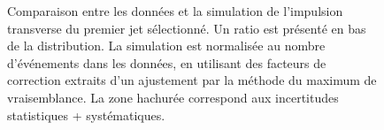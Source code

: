 \begin{figure}[p!]
    \caption{Comparaison entre les données et la simulation de l'impulsion transverse du premier jet sélectionné. Un ratio est présenté en bas de la distribution. La simulation est normalisée au nombre d'événements dans les données, en utilisant des facteurs de correction extraits d'un ajustement par la méthode du maximum de vraisemblance. La zone hachurée correspond aux incertitudes statistiques + systématiques.}
    \label{fig:higgs_data_mc_1jet}
\end{figure}


